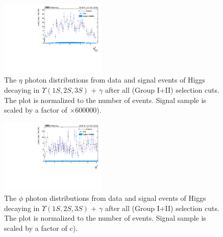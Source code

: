 \begin{figure}[!htbp]
\begin{center}
\includegraphics[width=0.45\textwidth]{figures_and_tables/outputPlots/HtoUpsilon_Cat0_ZZZZZ/nEvts/data_x_mc/withKinCuts/h_withKin_Photon_eta}\hspace*{1.cm}
\end{center}\vspace*{-.5cm}
\caption{The $\eta$ photon distributions from data and signal events of Higgs decaying in $\Upsilon(1S,2S,3S)$ + $\gamma$ after all (Group I+II) selection cuts. The plot is normalized to the number of events. Signal sample is scaled by a factor of $\times 600000$).}
\label{fig:etaPhoton_HtoUpsilon_Cat0_groupI_plus_II}
\end{figure}

\begin{figure}[!htbp]
\begin{center}
\includegraphics[width=0.45\textwidth]{figures_and_tables/outputPlots/HtoUpsilon_Cat0_ZZZZZ/nEvts/data_x_mc/withKinCuts/h_withKin_Photon_phi}\hspace*{1.cm}
\end{center}\vspace*{-.5cm}
\caption{The $\phi$ photon distributions from data and signal events of Higgs decaying in $\Upsilon(1S,2S,3S)$ + $\gamma$ after all (Group I+II) selection cuts. The plot is normalized to the number of events. Signal sample is scaled by a factor of c).}
\label{fig:phiPhoton_HtoUpsilon_Cat0_groupI_plus_II}
\end{figure}


